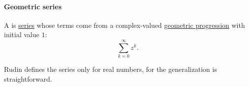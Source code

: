 \paragraph{Geometric series}

\begin{definition}\label{def:geometric_series}
  A  is \hyperref[def:convergent_series]{series} whose terms come from a complex-valued \hyperref[def:geometric_progression]{geometric progression} with initial value \( 1 \):
  \begin{equation}\label{eq:def:geometric_series}
    \sum_{k=0}^\infty z^k.
  \end{equation}
\end{definition}
\begin{comments}
  \item Rudin defines the series only for real numbers, for the generalization is straightforward.
\end{comments}

